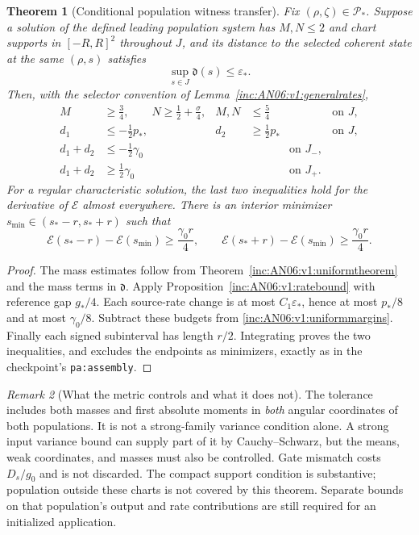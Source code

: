 \documentclass[11pt]{article}
\numberwithin{equation}{section}
\newtheorem{theorem}{Theorem}[section]
\theoremstyle{remark}\newtheorem{remark}[theorem]{Remark}
\newcommand{\1}{\mathbf 1}
\begin{document}
\begin{theorem}[Conditional population witness transfer]
\label{inc:AN06:v1:populationtransfer}
Fix $(\rho,\zeta)\in\mathcal P_*$. Suppose a solution of the defined
leading population system has $M,N\le2$ and chart supports in $[-R,R]^2$
throughout $J$, and its distance to the selected coherent state at the
same $(\rho,s)$ satisfies
\begin{equation}\label{inc:AN06:v1:tolerancecondition}
 \sup_{s\in J}\mathfrak d(s)\le\varepsilon_*.
\end{equation}
Then, with the selector convention of
Lemma~\ref{inc:AN06:v1:generalrates},
\begin{align}
 M&\ge\tfrac34,\qquad N\ge\tfrac12+\tfrac\sigma4,
 &M,N&\le\tfrac54 &&\text{on }J,\nonumber\\
 d_1&\le-\tfrac12p_*,&d_2&\ge\tfrac12p_* &&\text{on }J,
 \label{inc:AN06:v1:populationmargins}\\
 d_1+d_2&\le-\tfrac12\gamma_0&&&\text{on }J_-,\nonumber\\
 d_1+d_2&\ge\tfrac12\gamma_0&&&\text{on }J_+.\nonumber
\end{align}
For a regular characteristic solution, the last two inequalities hold
for the derivative of $\mathcal E$ almost everywhere. There is an
interior minimizer $s_{\min}\in(s_*-r,s_*+r)$ such that
\begin{equation}\label{inc:AN06:v1:rebound}
 \mathcal E(s_*-r)-\mathcal E(s_{\min})\ge\frac{\gamma_0r}{4},\qquad
 \mathcal E(s_*+r)-\mathcal E(s_{\min})\ge\frac{\gamma_0r}{4}.
\end{equation}
\end{theorem}
\begin{proof}
The mass estimates follow from Theorem~\ref{inc:AN06:v1:uniformtheorem}
and the mass terms in $\mathfrak d$.
Apply Proposition~\ref{inc:AN06:v1:ratebound} with reference gap $g_*/4$.
Each source-rate change is at most $C_1\varepsilon_*$, hence at most
$p_*/8$ and at most $\gamma_0/8$. Subtract these budgets from
\eqref{inc:AN06:v1:uniformmargins}. Finally each signed subinterval has
length $r/2$. Integrating proves the two inequalities, and excludes the
endpoints as minimizers, exactly as in the checkpoint's
\texttt{pa:assembly}.
\end{proof}

\begin{remark}[What the metric controls and what it does not]
The tolerance includes both masses and first absolute moments in
\emph{both} angular coordinates of both populations. It is not a
strong-family variance condition alone. A strong input variance bound can
supply part of it by Cauchy--Schwarz, but the means, weak coordinates,
and masses must also be controlled. Gate mismatch costs $D_s/g_0$ and is
not discarded. The compact support condition is substantive; population
outside these charts is not covered by this theorem. Separate bounds on
that population's output and rate contributions are still required for
an initialized application.
\end{remark}
\end{document}
